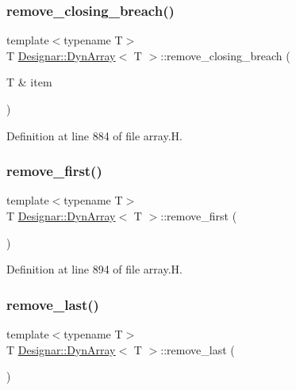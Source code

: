 \subsubsection{\texorpdfstring{remove\+\_\+closing\+\_\+breach()}{remove\_closing\_breach()}}
{\footnotesize\ttfamily template$<$typename T$>$ \\
T \hyperlink{class_designar_1_1_dyn_array}{Designar\+::\+Dyn\+Array}$<$ T $>$\+::remove\+\_\+closing\+\_\+breach (\begin{DoxyParamCaption}\item[{T \&}]{item }\end{DoxyParamCaption})\hspace{0.3cm}{\ttfamily [inline]}}



Definition at line 884 of file array.\+H.

\mbox{\label{class_designar_1_1_dyn_array_a4dc47bbb1961b4b3d8c8938e76bb77bd}} 
\subsubsection{\texorpdfstring{remove\+\_\+first()}{remove\_first()}}
{\footnotesize\ttfamily template$<$typename T$>$ \\
T \hyperlink{class_designar_1_1_dyn_array}{Designar\+::\+Dyn\+Array}$<$ T $>$\+::remove\+\_\+first (\begin{DoxyParamCaption}{ }\end{DoxyParamCaption})\hspace{0.3cm}{\ttfamily [inline]}}



Definition at line 894 of file array.\+H.

\mbox{\label{class_designar_1_1_dyn_array_a3e96bcac8a97cb56544d6466e834f8ac}} 
\subsubsection{\texorpdfstring{remove\+\_\+last()}{remove\_last()}}
{\footnotesize\ttfamily template$<$typename T$>$ \\
T \hyperlink{class_designar_1_1_dyn_array}{Designar\+::\+Dyn\+Array}$<$ T $>$\+::remove\+\_\+last (\begin{DoxyParamCaption}{ }\end{DoxyParamCaption})\hspace{0.3cm}{\ttfamily [inline]}}



